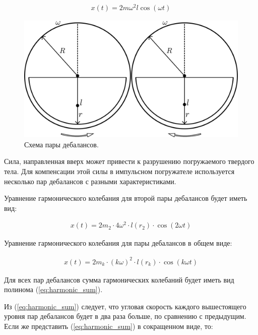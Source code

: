 \begin{equation}\label{eq:harmonic_dual}
    \begin{aligned}
        x(t) = 2 m \omega^2 l \cos (\omega t)
    \end{aligned}
\end{equation}

\begin{figure}[h]
    \centering
    \includegraphics[width=0.8\linewidth]{img/double_debalance.png}
    \caption{Схема пары дебалансов.}
    \label{fig:double_debalance}
\end{figure}

Сила, направленная вверх может привести к разрушению погружаемого твердого тела.
Для компенсации этой силы в импульсном погружателе используется несколько пар дебалансов с разными характеристиками.

Уравнение гармонического колебания для второй пары дебалансов будет иметь вид:

\begin{equation*}
    \begin{aligned}
        x(t) = 2 m_2 \cdot 4 \omega^2 \cdot l(r_2) \cdot \cos (2 \omega t)
    \end{aligned}
\end{equation*}

Уравнение гармонического колебания для пары дебалансов в общем виде:

\begin{equation}\label{eq:harmonic_common}
    \begin{aligned}
        x(t) = 2 m_k \cdot (k \omega)^2 \cdot l(r_k) \cdot \cos (k \omega t)
    \end{aligned}
\end{equation}

Для всех пар дебалансов сумма гармонических колебаний будет иметь вид полинома (\ref{eq:harmonic_sum}).

Из (\ref{eq:harmonic_sum}) следует, что угловая скорость каждого вышестоящего уровня пар дебалансов будет в два раза больше, по сравнению с предыдущим.
Если же представить (\ref{eq:harmonic_sum}) в сокращенном виде, то:

